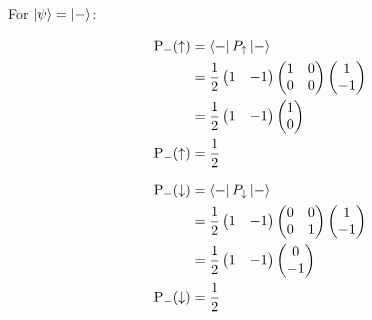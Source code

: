 \documentclass[a4paper, 10pt]{article}
\begin{document}
\begin{solution}
	\myspace

	\noindent For \( \ket{\psi} = \ket{-} \):

	\noindent
	\begin{minipage}[t]{0.46\textwidth}
		\begin{align*}
			\text{P}_{-}(\uparrow) & = \bra{-} P_{\uparrow} \ket{-}                                                                                                        \\
			                       & = \frac{1}{2} \begin{pmatrix} 1 & -1 \end{pmatrix} \begin{pmatrix} 1 & 0 \\ 0 & 0 \end{pmatrix} \begin{pmatrix} 1 \\ -1 \end{pmatrix} \\
			                       & = \frac{1}{2} \begin{pmatrix} 1 & -1 \end{pmatrix} \begin{pmatrix} 1 \\ 0 \end{pmatrix}                                               \\
			\text{P}_{-}(\uparrow) & = \frac{1}{2}
		\end{align*}
	\end{minipage}%
	\hfill \vrule \hfill
	\begin{minipage}[t]{0.46\textwidth}
		\begin{align*}
			\text{P}_{-}(\downarrow) & = \bra{-} P_{\downarrow} \ket{-}                                                                                                      \\
			                         & = \frac{1}{2} \begin{pmatrix} 1 & -1 \end{pmatrix} \begin{pmatrix} 0 & 0 \\ 0 & 1 \end{pmatrix} \begin{pmatrix} 1 \\ -1 \end{pmatrix} \\
			                         & = \frac{1}{2} \begin{pmatrix} 1 & -1 \end{pmatrix} \begin{pmatrix} 0 \\ -1 \end{pmatrix}                                              \\
			\text{P}_{-}(\downarrow) & = \frac{1}{2}
		\end{align*}
	\end{minipage}


\end{solution}
\end{document}
